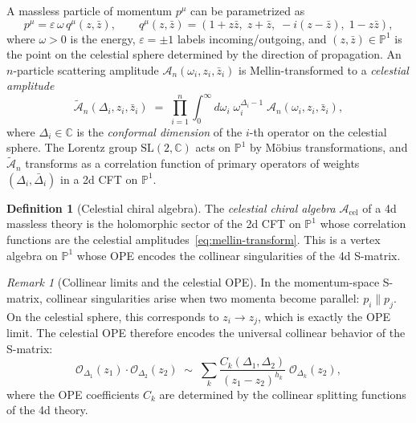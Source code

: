 \documentclass[11pt]{article}
\theoremstyle{definition}
\newtheorem{definition}[theorem]{Definition}
\theoremstyle{remark}
\newtheorem{remark}[theorem]{Remark}
\newcommand{\cA}{\mathcal{A}}
\newcommand{\cO}{\mathcal{O}}
\begin{document}
A massless particle of momentum $p^\mu$ can be parametrized as
\begin{equation}\label{eq:null-momentum-parametrization}
p^\mu = \varepsilon\, \omega\, q^\mu(z, \bar{z}),
\qquad
q^\mu(z,\bar{z}) = (1+z\bar{z},\; z+\bar{z},\;
-i(z-\bar{z}),\; 1-z\bar{z}),
\end{equation}
where $\omega > 0$ is the energy, $\varepsilon = \pm 1$ labels
incoming/outgoing, and $(z,\bar{z}) \in \mathbb{P}^1$ is the
point on the celestial sphere determined by the direction of
propagation. An $n$-particle scattering amplitude
$\cA_n(\omega_i, z_i, \bar{z}_i)$ is Mellin-transformed to a
\emph{celestial amplitude}
\begin{equation}\label{eq:mellin-transform}
\widetilde{\cA}_n(\Delta_i, z_i, \bar{z}_i)
\;=\;
\prod_{i=1}^{n}
\int_0^\infty d\omega_i\; \omega_i^{\Delta_i - 1}\;
\cA_n(\omega_i, z_i, \bar{z}_i),
\end{equation}
where $\Delta_i \in \mathbb{C}$ is the \emph{conformal dimension}
of the $i$-th operator on the celestial sphere. The Lorentz group
$\mathrm{SL}(2,\mathbb{C})$ acts on $\mathbb{P}^1$ by M\"obius
transformations, and $\widetilde{\cA}_n$ transforms as a
correlation function of primary operators of weights
$(\Delta_i, \bar{\Delta}_i)$ in a 2d CFT on $\mathbb{P}^1$.

\begin{definition}[Celestial chiral algebra]
\label{def:celestial-chiral-algebra}
The \emph{celestial chiral algebra} $\cA_{\mathrm{cel}}$ of a
4d massless theory is the holomorphic sector of the 2d CFT on
$\mathbb{P}^1$ whose correlation functions are the celestial
amplitudes~\eqref{eq:mellin-transform}. This is a vertex algebra
on $\mathbb{P}^1$ whose OPE encodes the collinear singularities
of the 4d S-matrix.
\end{definition}

\begin{remark}[Collinear limits and the celestial OPE]
\label{rem:collinear-ope}
In the momentum-space S-matrix, collinear singularities arise when
two momenta become parallel: $p_i \parallel p_j$. On the celestial
sphere, this corresponds to $z_i \to z_j$, which is exactly the
OPE limit. The celestial OPE therefore encodes the universal
collinear behavior of the S-matrix:
\[
\cO_{\Delta_1}(z_1) \cdot \cO_{\Delta_2}(z_2)
\;\sim\;
\sum_k \frac{C_k(\Delta_1, \Delta_2)}{(z_1 - z_2)^{h_k}}
\;\cO_{\Delta_k}(z_2),
\]
where the OPE coefficients $C_k$ are determined by the collinear
splitting functions of the 4d theory.
\end{remark}
\end{document}
